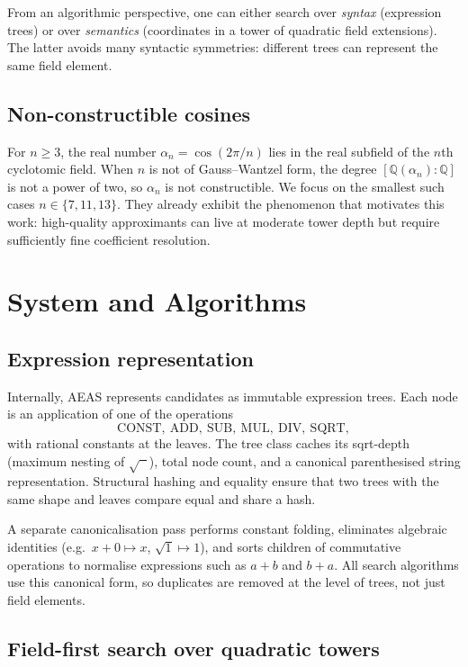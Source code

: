 \documentclass[11pt]{article}
\begin{document}
From an algorithmic perspective, one can either search over \emph{syntax} (expression trees) or over \emph{semantics} (coordinates in a tower of quadratic field extensions).
The latter avoids many syntactic symmetries: different trees can represent the same field element.

\subsection{Non-constructible cosines}

For $n\ge 3$, the real number $\alpha_n = \cos(2\pi/n)$ lies in the real subfield of the $n$th cyclotomic field.
When $n$ is not of Gauss--Wantzel form, the degree $[\mathbb{Q}(\alpha_n):\mathbb{Q}]$ is not a power of two, so $\alpha_n$ is not constructible.
We focus on the smallest such cases $n \in \{7,11,13\}$.
They already exhibit the phenomenon that motivates this work: high-quality approximants can live at moderate tower depth but require sufficiently fine coefficient resolution.

\section{System and Algorithms}

\subsection{Expression representation}

Internally, AEAS represents candidates as immutable expression trees.
Each node is an application of one of the operations
\[
  \mathrm{CONST},\ \mathrm{ADD},\ \mathrm{SUB},\ \mathrm{MUL},\ \mathrm{DIV},\ \mathrm{SQRT},
\]
with rational constants at the leaves.
The tree class caches its sqrt-depth (maximum nesting of $\sqrt{\phantom{x}}$), total node count, and a canonical parenthesised string representation.
Structural hashing and equality ensure that two trees with the same shape and leaves compare equal and share a hash.

A separate canonicalisation pass performs constant folding, eliminates algebraic identities (e.g.\ $x+0 \mapsto x$, $\sqrt{1}\mapsto 1$), and sorts children of commutative operations to normalise expressions such as $a+b$ and $b+a$.
All search algorithms use this canonical form, so duplicates are removed at the level of trees, not just field elements.

\subsection{Field-first search over quadratic towers}
\end{document}
